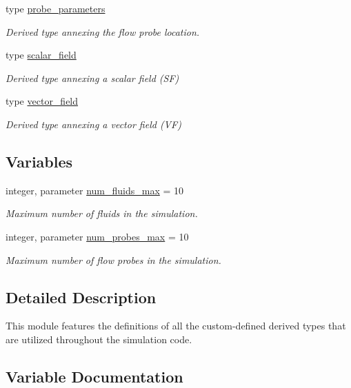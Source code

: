 \begin{DoxyCompactItemize}
type \hyperlink{structm__derived__types_1_1probe__parameters}{probe\+\_\+parameters}
\begin{DoxyCompactList}\small\item\em Derived type annexing the flow probe location. \end{DoxyCompactList}\item 
type \hyperlink{structm__derived__types_1_1scalar__field}{scalar\+\_\+field}
\begin{DoxyCompactList}\small\item\em Derived type annexing a scalar field (SF) \end{DoxyCompactList}\item 
type \hyperlink{structm__derived__types_1_1vector__field}{vector\+\_\+field}
\begin{DoxyCompactList}\small\item\em Derived type annexing a vector field (VF) \end{DoxyCompactList}\end{DoxyCompactItemize}
\subsection*{Variables}
\begin{DoxyCompactItemize}
\item 
integer, parameter \hyperlink{namespacem__derived__types_a3dde07670ef3e164534aa68c1830ff62}{num\+\_\+fluids\+\_\+max} = 10
\begin{DoxyCompactList}\small\item\em Maximum number of fluids in the simulation. \end{DoxyCompactList}\item 
integer, parameter \hyperlink{namespacem__derived__types_aa02f02777c477f6be0f89717ab209441}{num\+\_\+probes\+\_\+max} = 10
\begin{DoxyCompactList}\small\item\em Maximum number of flow probes in the simulation. \end{DoxyCompactList}\end{DoxyCompactItemize}


\subsection{Detailed Description}
This module features the definitions of all the custom-\/defined derived types that are utilized throughout the simulation code. 

\subsection{Variable Documentation}
\mbox{\label{namespacem__derived__types_a3dde07670ef3e164534aa68c1830ff62}} 
